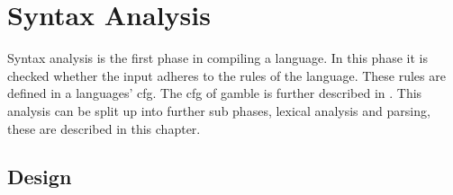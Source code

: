 %
%
%
%
%		
\clearpage



\chapter{Syntax Analysis}\label{sec:syntaxAnalysis}
Syntax analysis is the first phase in compiling a language.
In this phase it is checked whether the input adheres to the rules of the language.
These rules are defined in a languages' \acrshort{cfg}.
The \acrshort{cfg} of \gls{gamble} is further described in .
This analysis can be split up into further sub phases, lexical analysis and parsing, these are described in this chapter.
\section{Design}






